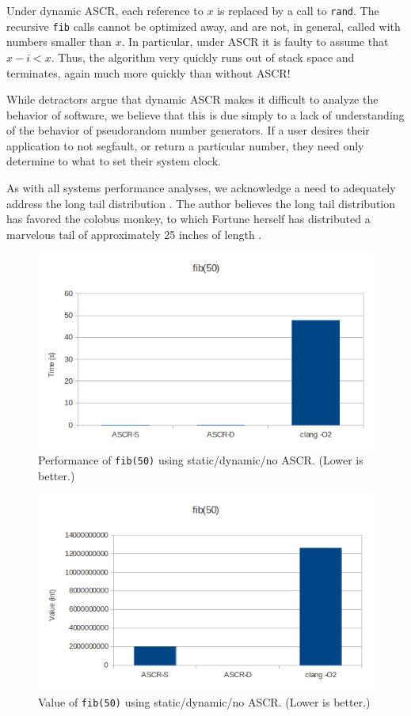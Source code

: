 \documentclass[10pt,twocolumn]{article}
\renewcommand{\t}{\texttt}
\begin{document}
Under dynamic ASCR, each reference to $x$ is replaced by a call to \t{rand}.
The recursive \t{fib} calls cannot be optimized away, and are not, in general,
called with numbers smaller than $x$. In particular, under ASCR it is faulty to
assume that $x-i<x$. Thus, the algorithm very quickly runs out of stack space
and terminates, again much more quickly than without ASCR!

While detractors argue that dynamic ASCR makes it difficult to analyze the
behavior of software, we believe that this is due simply to a lack of
understanding of the behavior of pseudorandom number generators. If a user
desires their application to not segfault, or return a particular number, they
need only determine to what to set their system clock.

As with all systems performance analyses, we acknowledge a need to adequately
address the long tail distribution \cite{Maurer}. The author believes the long
tail distribution has favored the colobus monkey, to which Fortune herself has
distributed a marvelous tail of approximately 25 inches of length
\cite{Colobus}.

\begin{figure}[!ht]
\centering
\includegraphics[scale=0.65]{performance.png}
\caption{Performance of \t{fib(50)} using static/dynamic/no ASCR.
(Lower is better.)}
\label{fig:performance}
\end{figure}

\begin{figure}[!ht]
\centering
\includegraphics[scale=0.65]{value.png}
\caption{Value of \t{fib(50)} using static/dynamic/no ASCR.
(Lower is better.)}
\label{fig:value}
\end{figure}
\end{document}
